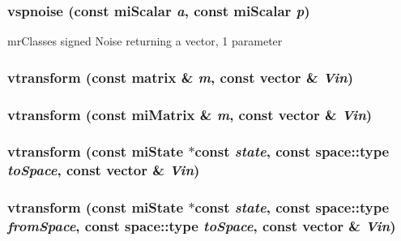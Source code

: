 \subsubsection{ vspnoise (const mi\-Scalar {\em a}, const mi\-Scalar {\em p})\hspace{0.3cm}{\tt  [inline]}}\label{namespacersl_a91}


mr\-Classes signed Noise returning a vector, 1 parameter 

\subsubsection{ vtransform (const matrix \& {\em m}, const vector \& {\em Vin})\hspace{0.3cm}{\tt  [inline]}}\label{namespacersl_a145}


\subsubsection{ vtransform (const mi\-Matrix \& {\em m}, const vector \& {\em Vin})\hspace{0.3cm}{\tt  [inline]}}\label{namespacersl_a144}


\subsubsection{ vtransform (const mi\-State $\ast$const {\em state}, const space::type {\em to\-Space}, const vector \& {\em Vin})\hspace{0.3cm}{\tt  [inline]}}\label{namespacersl_a143}


\subsubsection{ vtransform (const mi\-State $\ast$const {\em state}, const space::type {\em from\-Space}, const space::type {\em to\-Space}, const vector \& {\em Vin})\hspace{0.3cm}{\tt  [inline]}}\label{namespacersl_a142}




